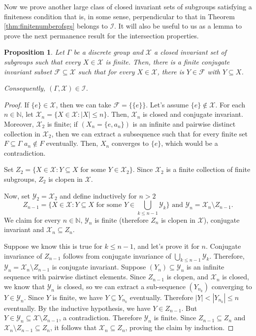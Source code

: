 \documentclass[a4paper, 12pt]{amsart}
\newtheorem{prp}[thm]{Proposition}
\theoremstyle{definition}
\theoremstyle{remark}
\numberwithin{equation}{section}
\begin{document}
Now we prove another large class of closed invariant sets of subgroups satisfying a finiteness condition that is, in some sense, perpendicular to that in Theorem \ref{thm:finitenumberofsgs} belongs to $\mathcal{I}$. It will also be useful to us as a lemma to prove the next permanence result for the intersection properties.
\begin{prp}
\label{prp:finitesgs}
    Let $\Gamma$ be a discrete group and $\mathcal{X}$ a closed invariant set of subgroups such that every $X\in\mathcal{X}$ is finite. Then, there is a finite conjugate invariant subset $\mathcal{F}\subseteq \mathcal{X}$ such that for every $X\in\mathcal{X}$, there is $Y\in\mathcal{F}$ with $Y\subseteq X$.
    
    Consequently, $(\Gamma, \mathcal{X})\in\mathcal{I}$.
\end{prp}
\begin{proof}
    If $\{e\}\in \mathcal{X}$, then we can take $\mathcal{F} = \{\{e\}\}$. Let's assume $\{e\}\notin \mathcal{X}$.
     For each $n\in\mathbb{N}$, let $\mathcal{X}_{n} = \{X\in\mathcal{X}: |X|\leq n\}$. Then, $\mathcal{X}_{n}$ is closed and conjugate invariant. Moreover, $\mathcal{X}_{2}$ is finite; if $(X_{n} = \{e, a_{n}\})$ is an infinite and pairwise distinct collection in $\mathcal{X}_{2}$, then we can extract a subsequence such that for every finite set $F\subseteq \Gamma$ $a_{n}\notin F$ eventually. Then, $X_{n}$ converges to $\{e\}$, which would be a contradiction.

    Set $Z_{2} = \{X\in \mathcal{X}: Y\subseteq X \text{ for some } Y\in\mathcal{X}_{2}\}$. Since $\mathcal{X}_{2}$ is a finite collection of finite subgroups, $Z_{2}$ is clopen in $\mathcal{X}$.

    Now, set $\mathcal{Y}_{2} = \mathcal{X}_{2}$ and define inductively for $n> 2$ $$Z_{n-1} = \{X\in \mathcal{X}: Y\subseteq X\text{ for some }Y\in\bigcup_{k\leq n-1}\mathcal{Y}_{k}\}\text{ and } \mathcal{Y}_{n} = \mathcal{X}_{n}\setminus Z_{n-1}.$$ We claim for every $n\in\mathbb{N}$, $\mathcal{Y}_{n}$ is finite (therefore $Z_{n}$ is clopen in $\mathcal{X}$), conjugate invariant and $\mathcal{X}_{n}\subseteq Z_{n}$.

    Suppose we know this is true for $k\leq n-1$, and let's prove it for $n$. Conjugate invariance of $Z_{n-1}$ follows from conjugate invariance of $\bigcup_{k\leq n-1}\mathcal{Y}_{k}$. Therefore, $\mathcal{Y}_{n} = \mathcal{X}_{n}\setminus Z_{n-1}$ is conjugate invariant. Suppose $(Y_{n})\subseteq \mathcal{Y}_{n}$ is an infinite sequence with pairwise distinct elements. Since $Z_{n-1}$ is clopen, and $\mathcal{X}_{n}$ is closed, we know that $\mathcal{Y}_{n}$ is closed, so we can extract a sub-sequence $(Y_{n_{k}})$ converging to $Y\in\mathcal{Y}_{n}$. Since $Y$ is finite, we have $Y\subseteq Y_{n_{k}}$ eventually. Therefore $|Y| < |Y_{n_{k}}|\leq n$ eventually. By the inductive hypothesis, we have $Y\in Z_{n-1}$. But $Y\in\mathcal{Y}_{n}\subseteq \mathcal{X}\setminus Z_{n-1}$, a contradiction. Therefore $\mathcal{Y}_{n}$ is finite. Since $Z_{n-1}\subseteq Z_{n}$ and $\mathcal{X}_{n}\setminus Z_{n-1}\subseteq Z_{n}$, it follows that $\mathcal{X}_{n}\subseteq Z_{n}$, proving the claim by induction.


\end{proof}
\end{document}
